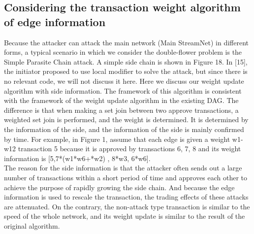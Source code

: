 \subsection{Considering the transaction weight algorithm of edge information}
Because the attacker can attack the main network (Main StreamNet) in different forms, a typical scenario in which we consider the double-flower problem is the Simple Parasite Chain attack. A simple side chain is shown in Figure 18. In [15], the initiator proposed to use local modifier to solve the attack, but since there is no relevant code, we will not discuss it here. Here we discuss our weight update algorithm with side information. The framework of this algorithm is consistent with the framework of the weight update algorithm in the existing DAG. The difference is that when making a set join between two approve transactions, a weighted set join is performed, and the weight is determined. It is determined by the information of the side, and the information of the side is mainly confirmed by time. For example, in Figure 1, assume that each edge is given a weight w1-w12 transaction 5 because it is approved by transactions 6, 7, 8 and its weight information is [5,7*(w1*w6+*w2) , 8*w3, 6*w6]. \\
\indent The reason for the side information is that the attacker often sends out a large number of transactions within a short period of time and approves each other to achieve the purpose of rapidly growing the side chain. And because the edge information is used to rescale the transaction, the trading effects of these attacks are attenuated. On the contrary, the non-attack type transaction is similar to the speed of the whole network, and its weight update is similar to the result of the original algorithm.



